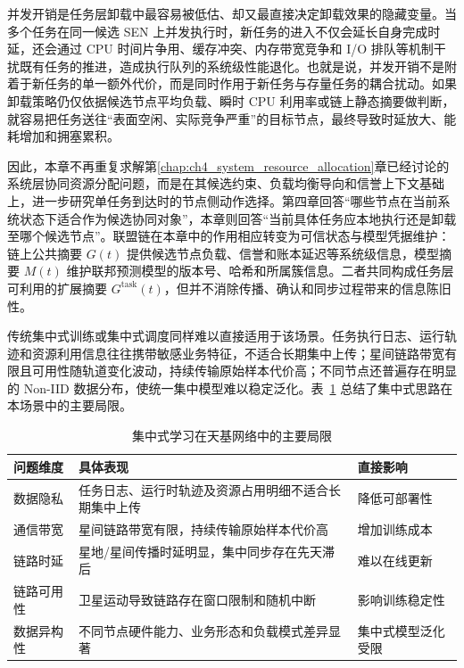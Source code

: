 并发开销是任务层卸载中最容易被低估、却又最直接决定卸载效果的隐藏变量。当多个任务在同一候选 SEN 上并发执行时，新任务的进入不仅会延长自身完成时延，还会通过 CPU 时间片争用、缓存冲突、内存带宽竞争和 I/O 排队等机制干扰既有任务的推进，造成执行队列的系统级性能退化。也就是说，并发开销不是附着于新任务的单一额外代价，而是同时作用于新任务与存量任务的耦合扰动。如果卸载策略仍仅依据候选节点平均负载、瞬时 CPU 利用率或链上静态摘要做判断，就容易把任务送往“表面空闲、实际竞争严重”的目标节点，最终导致时延放大、能耗增加和拥塞累积。

因此，本章不再重复求解第\ref{chap:ch4_system_resource_allocation}章已经讨论的系统层协同资源分配问题，而是在其候选约束、负载均衡导向和信誉上下文基础上，进一步研究单任务到达时的节点侧动作选择。第四章回答“哪些节点在当前系统状态下适合作为候选协同对象”，本章则回答“当前具体任务应本地执行还是卸载至哪个候选节点”。联盟链在本章中的作用相应转变为可信状态与模型凭据维护：链上公共摘要 $G(t)$ 提供候选节点负载、信誉和账本延迟等系统级信息，模型摘要 $M(t)$ 维护联邦预测模型的版本号、哈希和所属簇信息。二者共同构成任务层可利用的扩展摘要 $G^{\mathrm{task}}(t)$，但并不消除传播、确认和同步过程带来的信息陈旧性。

传统集中式训练或集中式调度同样难以直接适用于该场景。任务执行日志、运行轨迹和资源利用信息往往携带敏感业务特征，不适合长期集中上传；星间链路带宽有限且可用性随轨道变化波动，持续传输原始样本代价高；不同节点还普遍存在明显的 Non-IID 数据分布，使统一集中模型难以稳定泛化。表~\ref{tab:ch5_centralized_limitations} 总结了集中式思路在本场景中的主要局限。

\begin{table}[H]
    \centering
    \caption{集中式学习在天基网络中的主要局限}
    \label{tab:ch5_centralized_limitations}
    \begin{tabular}{p{2.3cm}p{7.2cm}p{2.6cm}}
        \toprule
        问题维度  & 具体表现                       & 直接影响      \\
        \midrule
        数据隐私  & 任务日志、运行时轨迹及资源占用明细不适合长期集中上传 & 降低可部署性    \\
        通信带宽  & 星间链路带宽有限，持续传输原始样本代价高       & 增加训练成本    \\
        链路时延  & 星地/星间传播时延明显，集中同步存在先天滞后     & 难以在线更新    \\
        链路可用性 & 卫星运动导致链路存在窗口限制和随机中断        & 影响训练稳定性   \\
        数据异构性 & 不同节点硬件能力、业务形态和负载模式差异显著     & 集中式模型泛化受限 \\
        \bottomrule
    \end{tabular}
\end{table}


